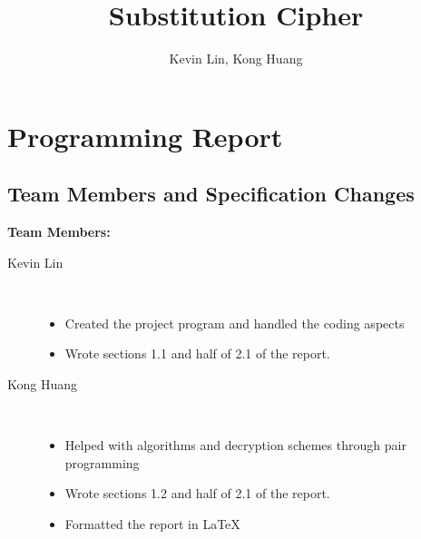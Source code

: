 \documentclass[a4paper,twoside,10pt]{report}
\begin{document}
\pagestyle{empty} %



\title{Substitution Cipher}
\author{Kevin Lin, Kong Huang}
\maketitle



\tableofcontents %
\cleardoublepage %

\pagestyle{plain} %


\chapter{Programming Report}\label{report}

\section{Team Members and Specification Changes}\label{members}
\noindent
\textbf{Team Members:}
\begin{description}
	\item[Kevin Lin] \hfill \\
	\vspace{-5mm}
	\begin{itemize}
		\item Created the project program and handled the coding aspects
		\item Wrote sections 1.1 and half of 2.1 of the report.
	\end{itemize}
	\item[Kong Huang] \hfill \\
	\vspace{-5mm}
	\begin{itemize}
		\item Helped with algorithms and decryption schemes through pair programming
		\item Wrote sections 1.2 and half of 2.1 of the report.
		\item Formatted the report in LaTeX
	\end{itemize}
\end{description}
\end{document}
